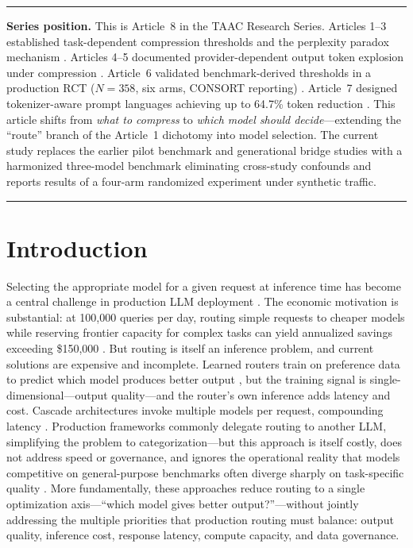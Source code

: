 \documentclass{article}
\newcommand{\taac}{\textsc{TAAC}}
\begin{document}
\vspace{0.5em}
\noindent\rule{\textwidth}{0.4pt}
\vspace{0.3em}
\noindent\textbf{Series position.} This is Article~8 in the \taac{} Research Series. Articles 1--3 established task-dependent compression thresholds and the perplexity paradox mechanism \citep{johnson2026compress,johnson2026perplexity,johnson2026cliff}. Articles 4--5 documented provider-dependent output token explosion under compression \citep{johnson2026greenai,johnson2026benchmark}. Article~6 validated benchmark-derived thresholds in a production RCT ($N = 358$, six arms, CONSORT reporting) \citep{johnson2026rct}. Article~7 designed tokenizer-aware prompt languages achieving up to 64.7\% token reduction \citep{johnson2026promptlang}. This article shifts from \emph{what to compress} to \emph{which model should decide}---extending the ``route'' branch of the Article~1 dichotomy into model selection. The current study replaces the earlier pilot benchmark and generational bridge studies with a harmonized three-model benchmark eliminating cross-study confounds and reports results of a four-arm randomized experiment under synthetic traffic.
\vspace{0.5em}
\noindent\rule{\textwidth}{0.4pt}

\newpage
\section{Introduction}
\label{sec:intro}

Selecting the appropriate model for a given request at inference time has become a central challenge in production LLM deployment \citep{jiang2023routellm,shnitzer2023large,chen2023frugalgpt}. The economic motivation is substantial: at 100,000 queries per day, routing simple requests to cheaper models while reserving frontier capacity for complex tasks can yield annualized savings exceeding \$150,000 \citep{lu2023routing}. But routing is itself an inference problem, and current solutions are expensive and incomplete. Learned routers train on preference data to predict which model produces better output \citep{jiang2023routellm,ong2025routellm}, but the training signal is single-dimensional---output quality---and the router's own inference adds latency and cost. Cascade architectures invoke multiple models per request, compounding latency \citep{chen2023frugalgpt,madaan2023automix,yue2024cascades}. Production frameworks commonly delegate routing to another LLM, simplifying the problem to categorization---but this approach is itself costly, does not address speed or governance, and ignores the operational reality that models competitive on general-purpose benchmarks often diverge sharply on task-specific quality \citep{ding2024hybrid,shnitzer2023large}. More fundamentally, these approaches reduce routing to a single optimization axis---``which model gives better output?''---without jointly addressing the multiple priorities that production routing must balance: output quality, inference cost, response latency, compute capacity, and data governance.
\end{document}
